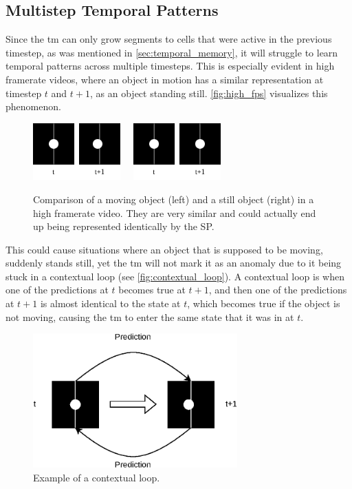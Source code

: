 \subsection{Multistep Temporal Patterns}
\label{sec:multistep_temporal_patterns}
Since the \gls*{tm} can only grow segments to cells that were active in the previous timestep, as was mentioned in \autoref{sec:temporal_memory}, it will struggle to learn temporal patterns across multiple timesteps. This is especially evident in high framerate videos, where an object in motion has a similar representation at timestep $t$ and $t+1$, as an object standing still. \autoref{fig:high_fps} visualizes this phenomenon.
\begin{figure}[H]
    \centering
    \includegraphics[width=0.3\textwidth]{resources/methodology/high_fps_moving.png}
    \unskip\ \vrule\
    \includegraphics[width=0.3\textwidth]{resources/methodology/high_fps_still.png}
    \caption[Comparison of a Moving Object in a High Framerate Video]{Comparison of a moving object (left) and a still object (right) in a high framerate video. They are very similar and could actually end up being represented identically by the SP.}
    \label{fig:high_fps}
\end{figure}
This could cause situations where an object that is supposed to be moving, suddenly stands still, yet the \gls*{tm} will not mark it as an anomaly due to it being stuck in a contextual loop (see \autoref{fig:contextual_loop}). A contextual loop is when one of the predictions at $t$ becomes true at $t+1$, and then one of the predictions at $t+1$ is almost identical to the state at $t$, which becomes true if the object is not moving, causing the \gls*{tm} to enter the same state that it was in at $t$.
\begin{figure}[H]
    \centering
    \includegraphics[width=0.7\textwidth]{resources/methodology/contextual_loop.eps}
    \caption[Contextual Loop Example]{Example of a contextual loop.}
    \label{fig:contextual_loop}
\end{figure}
